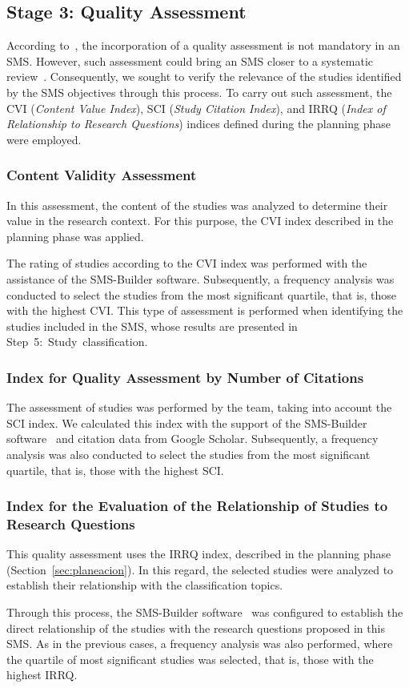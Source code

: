\subsection{Stage 3: Quality Assessment}
According to~\cite{Ali-01}, the incorporation of a quality assessment is not mandatory in an SMS. However, such assessment could bring an SMS closer to a systematic review~\cite{Petersen-01}. Consequently, we sought to verify the relevance of the studies identified by the SMS objectives through this process. To carry out such assessment, the CVI (\textit{Content Value Index}), SCI (\textit{Study Citation Index}), and IRRQ (\textit{Index of Relationship to Research Questions}) indices defined during the planning phase were employed.

\subsubsection{Content Validity Assessment}
In this assessment, the content of the studies was analyzed to determine their value in the research context. For this purpose, the CVI index described in the planning phase was applied.

The rating of studies according to the CVI index was performed with the assistance of the SMS-Builder software. Subsequently, a frequency analysis was conducted to select the studies from the most significant quartile, that is, those with the highest CVI. This type of assessment is performed when identifying the \totalEtapaDos{} studies included in the SMS, whose results are presented in \hbox{Step 5: Study classification.}

\subsubsection{Index for Quality Assessment by Number of Citations}
The assessment of studies was performed by the team, taking into account the SCI index. We calculated this index with the support of the SMS-Builder software~\cite{sms-builder-repo} and citation data from Google Scholar. Subsequently, a frequency analysis was also conducted to select the studies from the most significant quartile, that is, those with the highest SCI.

\subsubsection{Index for the Evaluation of the Relationship of Studies to Research Questions}
This quality assessment uses the IRRQ index, described in the planning phase (Section~\ref{sec:planeacion}). In this regard, the selected studies were analyzed to establish their relationship with the classification topics.

Through this process, the SMS-Builder software~\cite{sms-builder-repo} was configured to establish the direct relationship of the studies with the research questions proposed in this SMS. As in the previous cases, a frequency analysis was also performed, where the quartile of most significant studies was selected, that is, those with the highest IRRQ.